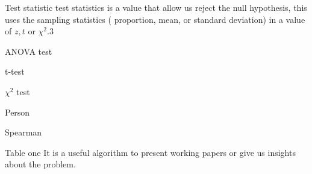 \documentclass{beamer}
\begin{document}
\begin{frame}{Test statistic}
test statistics is a value that allow us reject the null hypothesis, this uses the sampling statistics ( proportion, mean, or standard deviation) in a value of $z,t$ or $\chi^{2}$.3

\end{frame}



\begin{frame}{ANOVA test}


\end{frame}


\begin{frame}{t-test}

\end{frame}

\begin{frame}{$\chi^{2}$ test}

\end{frame}


\begin{frame}{Person}

\end{frame}


\begin{frame}{Spearman}

\end{frame}


\begin{frame}{Table one}
It is a useful algorithm to present working papers or give us insights about the problem.
\end{frame}
\end{document}
